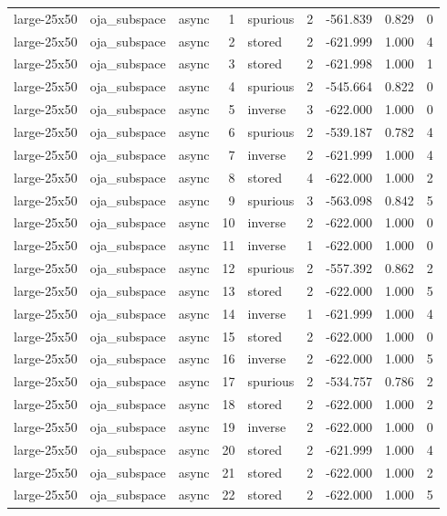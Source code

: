 \begin{tabular}{lllrlrrrr}
large-25x50 & oja\_subspace & async & 1 & spurious & 2 & -561.839 & 0.829 & 0 \\
large-25x50 & oja\_subspace & async & 2 & stored & 2 & -621.999 & 1.000 & 4 \\
large-25x50 & oja\_subspace & async & 3 & stored & 2 & -621.998 & 1.000 & 1 \\
large-25x50 & oja\_subspace & async & 4 & spurious & 2 & -545.664 & 0.822 & 0 \\
large-25x50 & oja\_subspace & async & 5 & inverse & 3 & -622.000 & 1.000 & 0 \\
large-25x50 & oja\_subspace & async & 6 & spurious & 2 & -539.187 & 0.782 & 4 \\
large-25x50 & oja\_subspace & async & 7 & inverse & 2 & -621.999 & 1.000 & 4 \\
large-25x50 & oja\_subspace & async & 8 & stored & 4 & -622.000 & 1.000 & 2 \\
large-25x50 & oja\_subspace & async & 9 & spurious & 3 & -563.098 & 0.842 & 5 \\
large-25x50 & oja\_subspace & async & 10 & inverse & 2 & -622.000 & 1.000 & 0 \\
large-25x50 & oja\_subspace & async & 11 & inverse & 1 & -622.000 & 1.000 & 0 \\
large-25x50 & oja\_subspace & async & 12 & spurious & 2 & -557.392 & 0.862 & 2 \\
large-25x50 & oja\_subspace & async & 13 & stored & 2 & -622.000 & 1.000 & 5 \\
large-25x50 & oja\_subspace & async & 14 & inverse & 1 & -621.999 & 1.000 & 4 \\
large-25x50 & oja\_subspace & async & 15 & stored & 2 & -622.000 & 1.000 & 0 \\
large-25x50 & oja\_subspace & async & 16 & inverse & 2 & -622.000 & 1.000 & 5 \\
large-25x50 & oja\_subspace & async & 17 & spurious & 2 & -534.757 & 0.786 & 2 \\
large-25x50 & oja\_subspace & async & 18 & stored & 2 & -622.000 & 1.000 & 2 \\
large-25x50 & oja\_subspace & async & 19 & inverse & 2 & -622.000 & 1.000 & 0 \\
large-25x50 & oja\_subspace & async & 20 & stored & 2 & -621.999 & 1.000 & 4 \\
large-25x50 & oja\_subspace & async & 21 & stored & 2 & -622.000 & 1.000 & 2 \\
large-25x50 & oja\_subspace & async & 22 & stored & 2 & -622.000 & 1.000 & 5 \\

\end{tabular}
